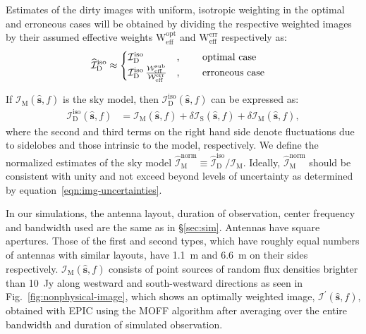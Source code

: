 \documentclass[a4paper,fleqn,usenatbib]{mnras}
\begin{document}
Estimates of the dirty images with uniform, isotropic weighting in the optimal and erroneous cases will be obtained by dividing the respective weighted images by their assumed effective weights $\mathrm{W}_\textrm{eff}^\textrm{opt}$ and $\mathrm{W}_\textrm{eff}^\textrm{err}$ respectively as:
\begin{align}
  \widehat{\mathcal{I}}_\textrm{D}^\textrm{iso} &\approx \begin{cases}
    \mathcal{I}_\textrm{D}^\textrm{iso} &\textrm{, \qquad optimal case} \\
    \mathcal{I}_\textrm{D}^\textrm{iso}\,\frac{\mathcal{W}_\textrm{eff}^\textrm{sub}}{\mathcal{W}_\textrm{eff}^\textrm{err}} &\textrm{, \qquad erroneous case}
  \end{cases}
\end{align}

If $\mathcal{I}_\textrm{M}(\hat{\mathbf{s}},f)$ is the sky model, then $\mathcal{I}_\textrm{D}^\textrm{iso}(\hat{\mathbf{s}},f)$ can be expressed as:
\begin{align}\label{eqn:img-uncertainties}
  \mathcal{I}_\textrm{D}^\textrm{iso}(\hat{\mathbf{s}},f) &= \mathcal{I}_\textrm{M}(\hat{\mathbf{s}},f) + \delta\mathcal{I}_\textrm{S}(\hat{\mathbf{s}},f) + \delta\mathcal{I}_\textrm{M}(\hat{\mathbf{s}},f),
\end{align}
where the second and third terms on the right hand side denote fluctuations due to sidelobes and those intrinsic to the model, respectively. We define the normalized estimates of the sky model $\widehat{\mathcal{I}}_\textrm{M}^\textrm{norm} \equiv \widehat{\mathcal{I}}_\textrm{D}^\textrm{iso} / \mathcal{I}_\textrm{M}$. Ideally, $\widehat{\mathcal{I}}_\textrm{M}^\textrm{norm}$ should be consistent with unity and not exceed beyond levels of uncertainty as determined by equation~\ref{eqn:img-uncertainties}.

In our simulations, the antenna layout, duration of observation, center frequency and bandwidth used are the same as in \S\ref{sec:sim}. Antennas have square apertures. Those of the first and second types, which have roughly equal numbers of antennas with similar layouts, have 1.1~m and 6.6~m on their sides respectively. $\mathcal{I}_\textrm{M}(\hat{\mathbf{s}},f)$ consists of point sources of random flux densities brighter than 10~Jy along westward and south-westward directions as seen in Fig.~\ref{fig:nonphysical-image}, which shows an optimally weighted image, $\mathcal{I}^\prime(\hat{\mathbf{s}},f)$, obtained with EPIC using the MOFF algorithm after averaging over the entire bandwidth and duration of simulated observation. 
\end{document}
